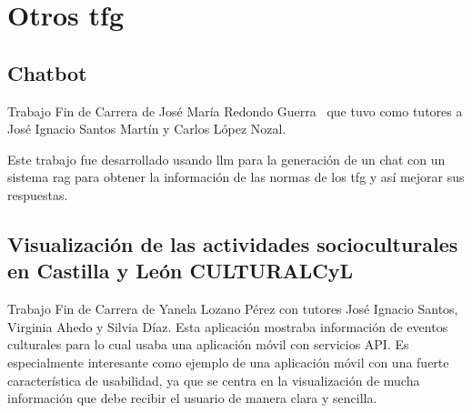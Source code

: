 \begin{table}[h]
	\centering
	\renewcommand{\arraystretch}{1.5} %
	\caption{Comparación de aplicaciones similares}
	\label{herramientasportipodeuso}
\end{table}



	
\section{Otros \acrfull{tfg}}
	\subsection{Chatbot}
	Trabajo Fin de Carrera de José María Redondo Guerra~\cite{chatbot_github} que tuvo como tutores a José Ignacio Santos Martín y Carlos López Nozal.
	
	Este trabajo fue desarrollado usando \acrfull{llm} para la generación de un chat con un sistema \acrshort{rag} para obtener la información de las normas de los \acrshort{tfg} y así mejorar sus respuestas.
	
	\subsection{Visualización de las actividades socioculturales en Castilla y León CULTURALCyL}
	Trabajo Fin de Carrera de Yanela Lozano Pérez con tutores José Ignacio Santos, Virginia Ahedo y Silvia Díaz.
	Esta aplicación mostraba información de eventos culturales para lo cual usaba una aplicación móvil con servicios API.
	Es especialmente interesante como ejemplo de una aplicación móvil con una fuerte característica de usabilidad, ya que se centra en la visualización de mucha información que debe recibir el usuario de manera clara y sencilla.